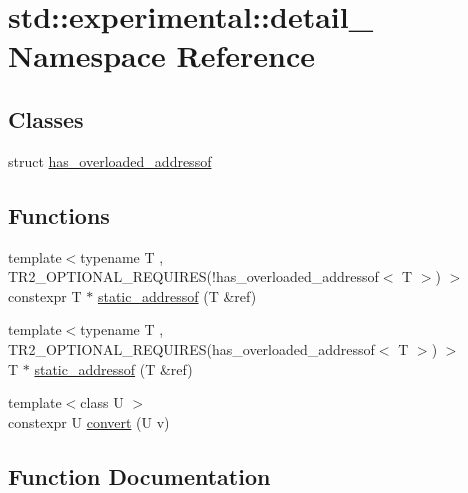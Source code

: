 \hypertarget{namespacestd_1_1experimental_1_1detail__}{}\section{std\+:\+:experimental\+:\+:detail\+\_\+ Namespace Reference}
\label{namespacestd_1_1experimental_1_1detail__}
\subsection*{Classes}
\begin{DoxyCompactItemize}
\item 
struct \mbox{\hyperlink{structstd_1_1experimental_1_1detail___1_1has__overloaded__addressof}{has\+\_\+overloaded\+\_\+addressof}}
\end{DoxyCompactItemize}
\subsection*{Functions}
\begin{DoxyCompactItemize}
\item 
{\footnotesize template$<$typename T , T\+R2\+\_\+\+O\+P\+T\+I\+O\+N\+A\+L\+\_\+\+R\+E\+Q\+U\+I\+R\+E\+S(!has\+\_\+overloaded\+\_\+addressof$<$ T $>$) $>$ }\\constexpr T $\ast$ \mbox{\hyperlink{namespacestd_1_1experimental_1_1detail___aa205cc382da48555de424fc09d3286b1}{static\+\_\+addressof}} (T \&ref)
\item 
{\footnotesize template$<$typename T , T\+R2\+\_\+\+O\+P\+T\+I\+O\+N\+A\+L\+\_\+\+R\+E\+Q\+U\+I\+R\+E\+S(has\+\_\+overloaded\+\_\+addressof$<$ T $>$) $>$ }\\T $\ast$ \mbox{\hyperlink{namespacestd_1_1experimental_1_1detail___a9255e1a7ac3bf9c92e04e8fb4303f352}{static\+\_\+addressof}} (T \&ref)
\item 
{\footnotesize template$<$class U $>$ }\\constexpr U \mbox{\hyperlink{namespacestd_1_1experimental_1_1detail___a2a47800848ffd486b8ca82d2fbbb244d}{convert}} (U v)
\end{DoxyCompactItemize}


\subsection{Function Documentation}
\mbox{\label{namespacestd_1_1experimental_1_1detail___a2a47800848ffd486b8ca82d2fbbb244d}} 
